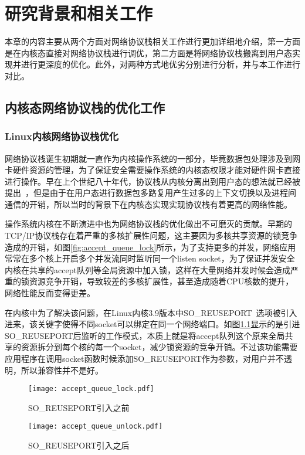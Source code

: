 \chapter{研究背景和相关工作}
\label{cha:02_related_work}
本章的内容主要从两个方面对网络协议栈相关工作进行更加详细地介绍，第一方面是在内核态直接对网络协议栈进行调优，第二方面是将网络协议栈搬离到用户态实现并进行更深度的优化。此外，对两种方式地优劣分别进行分析，并与本工作进行对比。

\section{内核态网络协议栈的优化工作}
\label{sec:02_kernel}

\subsection{Linux内核网络协议栈优化}
网络协议栈诞生初期就一直作为内核操作系统的一部分，毕竟数据包处理涉及到网卡硬件资源的管理，为了保证安全需要操作系统的内核态权限才能对硬件网卡直接进行操作。早在上个世纪八十年代，协议栈从内核分离出到用户态的想法就已经被提出~\cite{1987packer}，但是由于在用户态进行数据包多路复用产生过多的上下文切换以及进程间通信的开销，所以当时的背景下在内核态实现实现协议栈有着更高的网络性能。

操作系统内核在不断演进中也为网络协议栈的优化做出不可磨灭的贡献。早期的TCP/IP协议栈存在着严重的多核扩展性问题，这主要因为多核共享资源的锁竞争造成的开销，如图\ref{fig:accept_queue_lock}所示，为了支持更多的并发，网络应用常常在多个核上开启多个并发流同时监听同一个listen socket，为了保证并发安全内核在共享的accept队列等全局资源中加入锁，这样在大量网络并发时候会造成严重的锁资源竞争开销，导致较差的多核扩展性，甚至造成随着CPU核数的提升，网络性能反而变得更差。

在内核中为了解决该问题，在Linux内核3.9版本中SO\_REUSEPORT~\cite{SO_REUSEPORT}选项被引入进来，该关键字使得不同socket可以绑定在同一个网络端口。如图\ref{fig:accept_queue_unlock}显示的是引进SO\_REUSEPORT后监听的工作模式，本质上就是将accept队列这个原来全局共享的资源拆分到每个核的每一个socket，减少锁资源的竞争开销。不过该功能需要应用程序在调用socket函数时候添加SO\_REUSEPORT作为参数，对用户并不透明，所以兼容性并不是好。

\begin{figure}[htbp]
\centering
\begin{minipage}[t]{0.48\textwidth}
\centering
\texttt{[image: accept\_queue\_lock.pdf]}
\caption{SO\_REUSEPORT引入之前}
\label{fig:accept_queue_lock}
\end{minipage}
\begin{minipage}[t]{0.48\textwidth}
\centering
\texttt{[image: accept\_queue\_unlock.pdf]}
\caption{SO\_REUSEPORT引入之后}
\label{fig:accept_queue_unlock}
\end{minipage}
\end{figure}

